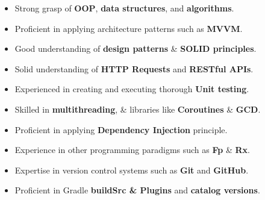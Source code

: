 \documentclass[10pt,a4paper,ragged2e,withhyper]{altacv}
\begin{document}
    \begin{paracol}{2}







        \switchcolumn

        {\large\begin{itemize}

                   \item Strong grasp of \textbf{OOP}, \textbf{data structures}, and \textbf{algorithms}.
                   \item Proficient in applying architecture patterns such as \textbf{MVVM}.
                   \item Good understanding of \textbf{design patterns} \& \textbf{SOLID principles}.
                   \item Solid understanding of \textbf{HTTP Requests} and \textbf{RESTful APIs}.
                   \item Experienced in creating and executing thorough \textbf{Unit testing}.
                   \item Skilled in \textbf{multithreading}, \& libraries like \textbf{Coroutines} \& \textbf{GCD}.
                   \item Proficient in applying \textbf{Dependency Injection} principle.
                   \item Experience in other programming paradigms such as \textbf{Fp} \& \textbf{Rx}.
                   \item Expertise in version control systems such as \textbf{Git} and \textbf{GitHub}.
                   \item Proficient in Gradle \textbf{buildSrc \& Plugins} and \textbf{catalog versions}.


\end{itemize}}
\end{paracol}
\end{document}
